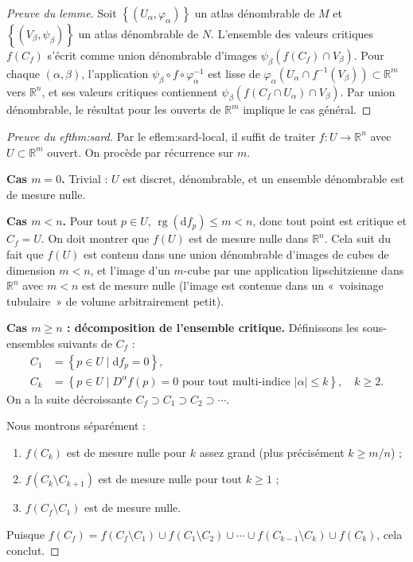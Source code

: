 \documentclass[12pt,a4paper,openany]{book}
\theoremstyle{definition}
\theoremstyle{plain}
\theoremstyle{remark}
\newcommand{\R}{\mathbb{R}}
\DeclareMathOperator{\rg}{rg}
\newcommand{\dd}{\mathrm{d}}
\newcommand{\abs}[1]{\left|#1\right|}
\newcommand{\set}[1]{\left\{#1\right\}}
\begin{document}
\begin{proof}[Preuve du lemme]
Soit $\set{(U_\alpha, \varphi_\alpha)}$ un atlas dénombrable de $M$ et
$\set{(V_\beta, \psi_\beta)}$ un atlas dénombrable de $N$. L'ensemble des
valeurs critiques $f(C_f)$ s'écrit comme union dénombrable d'images
$\psi_\beta(f(C_f) \cap V_\beta)$. Pour chaque $(\alpha, \beta)$,
l'application $\psi_\beta \circ f \circ \varphi_\alpha^{-1}$ est lisse de
$\varphi_\alpha(U_\alpha \cap f^{-1}(V_\beta)) \subset \R^m$ vers $\R^n$, et
ses valeurs critiques contiennent $\psi_\beta(f(C_f \cap U_\alpha) \cap V_\beta)$.
Par union dénombrable, le résultat pour les ouverts de $\R^m$ implique le cas
général.
\end{proof}

\begin{proof}[Preuve du 
ef{thm:sard}]
Par le 
ef{lem:sard-local}, il suffit de traiter $f \colon U \to \R^n$
avec $U \subset \R^m$ ouvert. On procède par récurrence sur $m$.

\medskip\noindent\textbf{Cas $m = 0$.} Trivial : $U$ est discret, dénombrable,
et un ensemble dénombrable est de mesure nulle.

\medskip\noindent\textbf{Cas $m < n$.} Pour tout $p \in U$,
$\rg(\dd f_p) \leq m < n$, donc tout point est critique et $C_f = U$. On
doit montrer que $f(U)$ est de mesure nulle dans $\R^n$. Cela suit du fait
que $f(U)$ est contenu dans une union dénombrable d'images de cubes de
dimension $m < n$, et l'image d'un $m$-cube par une application lipschitzienne
dans $\R^n$ avec $m < n$ est de mesure nulle (l'image est contenue dans un
«~voisinage tubulaire~» de volume arbitrairement petit).

\medskip\noindent\textbf{Cas $m \geq n$ : décomposition de l'ensemble critique.}
Définissons les sous-ensembles suivants de $C_f$ :
\begin{align*}
  C_1 &= \set{p \in U \mid \dd f_p = 0}, \\
  C_k &= \set{p \in U \mid D^\alpha f(p) = 0
              \text{ pour tout multi-indice } \abs{\alpha} \leq k},
              \quad k \geq 2.
\end{align*}
On a la suite décroissante $C_f \supset C_1 \supset C_2 \supset \cdots$.

Nous montrons séparément :
\begin{enumerate}[label=(\Alph*)]
  \item $f(C_k)$ est de mesure nulle pour $k$ assez grand
  (plus précisément $k \geq m/n$) ;
  \item $f(C_{k} \setminus C_{k+1})$ est de mesure nulle pour tout $k \geq 1$ ;
  \item $f(C_f \setminus C_1)$ est de mesure nulle.
\end{enumerate}
Puisque $f(C_f) = f(C_f \setminus C_1) \cup f(C_1 \setminus C_2) \cup \cdots
\cup f(C_{k-1} \setminus C_k) \cup f(C_k)$, cela conclut.


\end{proof}
\end{document}
